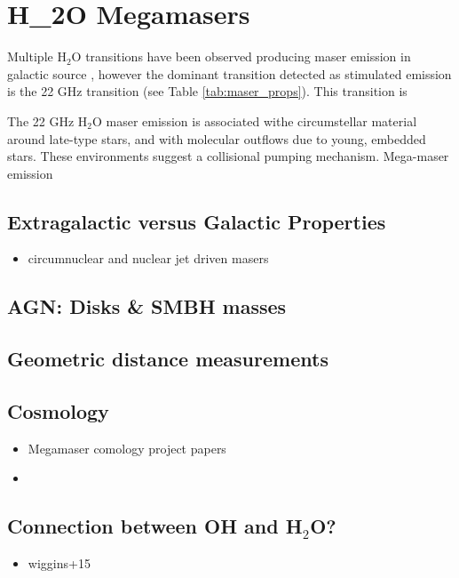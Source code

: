 \section{H_2O Megamasers}
\label{sec:h2o_mm}

Multiple H$_2$O transitions have been observed producing maser emission in galactic source \citep{Elitzur_1992}, however the dominant transition detected as stimulated emission is the 22 GHz transition (see Table \ref{tab:maser_props}). This transition is 

The 22 GHz H$_2$O maser emission is associated withe circumstellar material around late-type stars, and with molecular outflows due to young, embedded stars. These environments suggest a collisional pumping mechanism. Mega-maser emission 

\subsection{Extragalactic versus Galactic Properties}
\label{sub:h2o_props}

\begin{itemize}
\item circumnuclear and nuclear jet driven masers
\end{itemize}

\subsection{AGN: Disks \& SMBH masses}
\label{sub:h20_smbh_mass}

\subsection{Geometric distance measurements}
\label{sub:h2o_distance}



\subsection{Cosmology}
\label{sub:h2o_cosmo}

\begin{itemize}
\item Megamaser comology project papers
\item 
\end{itemize}

\subsection{Connection between OH and H$_2$O?}
\label{sec:oh_and_h2o}

\begin{itemize}
\item wiggins+15
\end{itemize}